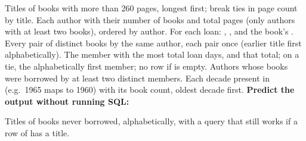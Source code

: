 \documentclass[10pt]{scrartcl}
\begin{document}
\begin{enumerate}[label=\textbf{E\arabic*.},leftmargin=2.4em,itemsep=4pt]
  \ii Titles of books with more than 260 pages, longest first; break ties in page count by title.
  \ii Each author with their number of books and total pages (only authors with at least two books), ordered by author.
  \ii For each loan: , , and the book's .
  \ii Every pair of distinct books by the same author, each pair once (earlier title first alphabetically).
  \ii The member with the most total loan days, and that total; on a tie, the alphabetically first member; no row if  is empty.
  \ii Authors whose books were borrowed by at least two distinct members.
  \ii Each decade present in  (e.g.\ 1965 maps to 1960) with its book count, oldest decade first.
  \ii \textbf{Predict the output without running SQL:}
  \begin{enumerate}[(a)]
    \ii {}
    \ii {}
    \ii {}
  \end{enumerate}
  \ii Titles of books never borrowed, alphabetically, with a query that still works if a row of  has a  title.
\end{enumerate}
\end{document}
